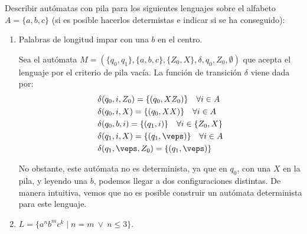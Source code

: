 \begin{ejercicio}\label{ej:1.5.23}
    Describir autómatas con pila para los siguientes lenguajes sobre el alfabeto $A = \{a,b,c\}$ (si es posible hacerlos determistas e indicar si se ha conseguido):
    \begin{enumerate}
        \item Palabras de longitud impar con una $b$ en el centro.
        
        Sea el autómata $M = (\{q_0,q_1\},\{a,b,c\},\{Z_0,X\},\delta,q_0,Z_0,\emptyset)$ que acepta el lenguaje por el criterio de pila vacía. La función de transición $\delta$ viene dada por:
        \begin{align*}
            &\delta(q_0,i,Z_0) = \{(q_0,XZ_0)\} \quad \forall i\in A \\
            &\delta(q_0,i,X) = \{(q_0,XX)\} \quad \forall i\in A \\
            &\delta(q_0,b,i) = \{(q_1,i)\} \quad \forall i\in \{Z_0,X\} \\
            &\delta(q_1,i,X) = \{(q_1,\veps)\} \quad \forall i\in A \\
            &\delta(q_1,\veps,Z_0) = \{(q_1,\veps)\} \\
        \end{align*}

        No obstante, este autómata no es determinista, ya que en $q_0$, con una $X$ en la pila, y leyendo una $b$, podemos llegar a dos configuraciones distintas. De manera intuitiva, vemos que no es posible construir un autómata determinista para este lenguaje.
        
        \item $L = \{a^n b^m c^k \mid n = m\ \lor\ n \leq 3\}$.
        

\end{enumerate}
\end{ejercicio}

